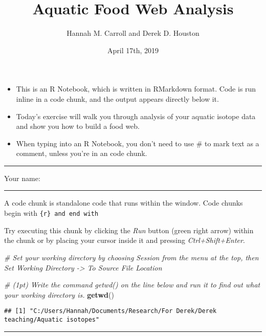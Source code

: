 \documentclass[]{article}
\title{Aquatic Food Web Analysis}
\author{Hannah M. Carroll and Derek D. Houston}
\date{April 17th, 2019}
\newenvironment{Shaded}{\begin{snugshade}}{\end{snugshade}}
\newcommand{\KeywordTok}[1]{\textcolor[rgb]{0.13,0.29,0.53}{\textbf{#1}}}
\newcommand{\CommentTok}[1]{\textcolor[rgb]{0.56,0.35,0.01}{\textit{#1}}}
\newcommand{\NormalTok}[1]{#1}
\begin{document}
\maketitle

\begin{itemize}
\item
  This is an R Notebook, which is written in RMarkdown format. Code is
  run inline in a code chunk, and the output appears directly below it.
\item
  Today's exercise will walk you through analysis of your aquatic
  isotope data and show you how to build a food web.
\item
  When typing into an R Notebook, you don't need to use \# to mark text
  as a comment, unless you're in an code chunk.
\end{itemize}

\begin{center}\rule{0.5\linewidth}{\linethickness}\end{center}

Your name:

\begin{center}\rule{0.5\linewidth}{\linethickness}\end{center}

A code chunk is standalone code that runs within the window. Code chunks
begin with \texttt{\{r\}\ and\ end\ with}

Try executing this chunk by clicking the \emph{Run} button (green right
arrow) within the chunk or by placing your cursor inside it and pressing
\emph{Ctrl+Shift+Enter}.

\begin{Shaded}
\begin{Highlighting}[]
\CommentTok{# Set your working directory by choosing Session from the menu at the top, then Set Working Directory -> To Source File Location}

\CommentTok{# (1pt) Write the command getwd() on the line below and run it to find out what your working directory is.}
\KeywordTok{getwd}\NormalTok{()}
\end{Highlighting}
\end{Shaded}

\begin{verbatim}
## [1] "C:/Users/Hannah/Documents/Research/For Derek/Derek teaching/Aquatic isotopes"
\end{verbatim}

\begin{center}\rule{0.5\linewidth}{\linethickness}\end{center}
\end{document}

